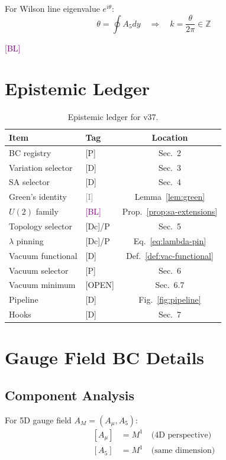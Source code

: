 \documentclass[11pt,a4paper]{article}
\newcommand{\tagD}{\textcolor{blue!70!black}{[D]}}
\newcommand{\tagDc}{\textcolor{blue!50!black}{[Dc]}}
\newcommand{\tagP}{\textcolor{green!50!black}{[P]}}
\newcommand{\tagI}{\textcolor{gray}{[I]}}
\newcommand{\tagBL}{\textcolor{purple}{[BL]}}
\newcommand{\tagOPEN}{\textcolor{red!70!black}{[OPEN]}}
\begin{document}
For Wilson line eigenvalue $e^{i\theta}$:
\begin{equation}
\label{eq:app-gauge-wind}
\theta = \oint A_5 dy \quad \Rightarrow \quad k = \frac{\theta}{2\pi} \in \mathbb{Z}
\end{equation}

\tagBL

\section{Epistemic Ledger}
\label{app:ledger}

\begin{table}[h]
\centering
\begin{tabular}{llc}
\toprule
Item & Tag & Location \\
\midrule
BC registry & \tagP & Sec.~2 \\
Variation selector & \tagD & Sec.~3 \\
SA selector & \tagD & Sec.~4 \\
Green's identity & \tagI & Lemma~\ref{lem:green} \\
$U(2)$ family & \tagBL & Prop.~\ref{prop:sa-extensions} \\
Topology selector & \tagDc/P & Sec.~5 \\
$\lambda$ pinning & \tagDc/P & Eq.~\eqref{eq:lambda-pin} \\
Vacuum functional & \tagD & Def.~\ref{def:vac-functional} \\
Vacuum selector & \tagP & Sec.~6 \\
Vacuum minimum & \tagOPEN & Sec.~6.7 \\
Pipeline & \tagD & Fig.~\ref{fig:pipeline} \\
Hooks & \tagD & Sec.~7 \\
\bottomrule
\end{tabular}
\caption{Epistemic ledger for v37.}
\label{tab:ledger}
\end{table}

\section{Gauge Field BC Details}
\label{app:gauge}

\subsection{Component Analysis}

For 5D gauge field $A_M = (A_\mu, A_5)$:
\begin{align}
\label{eq:app-gauge-Amu}
[A_\mu] &= M^1 \quad \text{(4D perspective)} \\
\label{eq:app-gauge-A5}
[A_5] &= M^1 \quad \text{(same dimension)}
\end{align}
\end{document}

